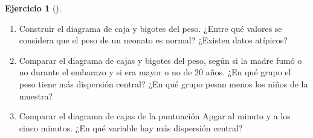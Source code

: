 \documentclass[
  spanish,
  a4paper,
]{scrreport}
\theoremstyle{definition}
\newtheorem{exercise}{Ejercicio}[chapter]
\theoremstyle{remark}
\begin{document}
\begin{exercise}[]
\begin{enumerate}
  Comparar la distribución de frecuencias relativas del peso de los
  neonatos según si la madre fumaba o no antes del embarazo. ¿Qué se
  puede concluir?
\item
  Construir el diagrama de caja y bigotes del peso. ¿Entre qué valores
  se considera que el peso de un neonato es normal? ¿Existen datos
  atípicos?
\item
  Comparar el diagrama de cajas y bigotes del peso, según si la madre
  fumó o no durante el embarazo y si era mayor o no de 20 años. ¿En qué
  grupo el peso tiene más dispersión central? ¿En qué grupo pesan menos
  los niños de la muestra?
\item
  Comparar el diagrama de cajas de la puntuación Apgar al minuto y a los
  cinco minutos. ¿En qué variable hay más dispersión central?
\end{enumerate}

\end{exercise}
\end{document}
